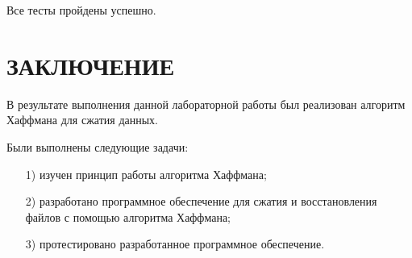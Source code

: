 \documentclass{bmstu}
\begin{document}
Все тесты пройдены успешно.

{\centering \chapter*{ЗАКЛЮЧЕНИЕ}}

В результате выполнения данной лабораторной работы был реализован алгоритм Хаффмана для сжатия данных.

Были выполнены следующие задачи:
\begin{enumerate}
\item[1)] изучен принцип работы алгоритма Хаффмана;
\item[2)] разработано программное обеспечение для сжатия и восстановления файлов с помощью алгоритма Хаффмана;
\item[3)] протестировано разработанное программное обеспечение.
\end{enumerate}

{\centering \printbibliography[title=СПИСОК ИСПОЛЬЗОВАННЫХ ИСТОЧНИКОВ,heading=bibintoc]}
\end{document}
